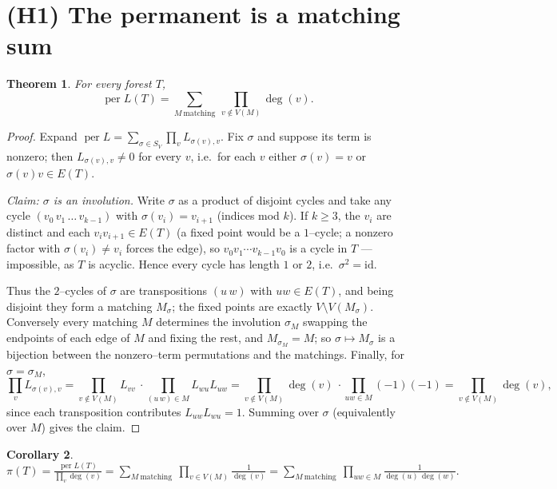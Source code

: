 \documentclass[11pt]{article}
\newtheorem{theorem}{Theorem}
\newtheorem{corollary}[theorem]{Corollary}
\newcommand{\per}{\operatorname{per}}
\begin{document}
\section{(H1) The permanent is a matching sum}

\begin{theorem}\label{thm:H1}
For every forest $T$,
\[
  \per L(T)=\sum_{M\ \mathrm{matching}}\ \prod_{v\notin V(M)}\deg(v).
\]
\end{theorem}

\begin{proof}
Expand $\per L=\sum_{\sigma\in S_V}\prod_{v}L_{\sigma(v),v}$. Fix $\sigma$ and suppose its term is nonzero;
then $L_{\sigma(v),v}\neq0$ for every $v$, i.e.\ for each $v$ either $\sigma(v)=v$ or $\sigma(v)v\in E(T)$.

\emph{Claim: $\sigma$ is an involution.} Write $\sigma$ as a product of disjoint cycles and take any cycle
$(v_0\,v_1\,\dots\,v_{k-1})$ with $\sigma(v_i)=v_{i+1}$ (indices mod $k$). If $k\ge3$, the $v_i$ are distinct
and each $v_iv_{i+1}\in E(T)$ (a fixed point would be a $1$--cycle; a nonzero factor with $\sigma(v_i)\neq
v_i$ forces the edge), so $v_0v_1\cdots v_{k-1}v_0$ is a cycle in $T$ --- impossible, as $T$ is acyclic. Hence
every cycle has length $1$ or $2$, i.e.\ $\sigma^2=\mathrm{id}$.

Thus the $2$--cycles of $\sigma$ are transpositions $(u\,w)$ with $uw\in E(T)$, and being disjoint they form a
matching $M_\sigma$; the fixed points are exactly $V\setminus V(M_\sigma)$. Conversely every matching $M$
determines the involution $\sigma_M$ swapping the endpoints of each edge of $M$ and fixing the rest, and
$M_{\sigma_M}=M$; so $\sigma\mapsto M_\sigma$ is a bijection between the nonzero--term permutations and the
matchings. Finally, for $\sigma=\sigma_M$,
\[
  \prod_v L_{\sigma(v),v}
  =\prod_{v\notin V(M)}L_{vv}\ \cdot\!\!\prod_{(u\,w)\in M}\!\!L_{wu}L_{uw}
  =\prod_{v\notin V(M)}\deg(v)\ \cdot\!\!\prod_{uw\in M}(-1)(-1)
  =\prod_{v\notin V(M)}\deg(v),
\]
since each transposition contributes $L_{uw}L_{wu}=1$. Summing over $\sigma$ (equivalently over $M$) gives the
claim.
\end{proof}

\begin{corollary}\label{cor:piweight}
$\displaystyle \pi(T)=\frac{\per L(T)}{\prod_v\deg(v)}
  =\sum_{M\ \mathrm{matching}}\ \prod_{v\in V(M)}\frac{1}{\deg(v)}
  =\sum_{M\ \mathrm{matching}}\ \prod_{uw\in M}\frac{1}{\deg(u)\,\deg(w)}.$
\end{corollary}
\end{document}
